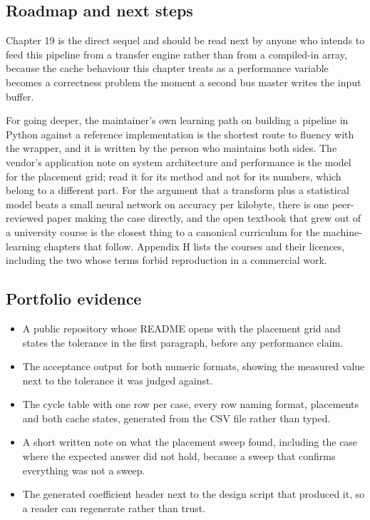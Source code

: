 \subsection*{Roadmap and next steps}

Chapter 19 is the direct sequel and should be read next by anyone who intends
to feed this pipeline from a transfer engine rather than from a compiled-in
array, because the cache behaviour this chapter treats as a performance
variable becomes a correctness problem the moment a second bus master writes
the input buffer.

For going deeper, the maintainer's own learning path on building a pipeline in
Python against a reference implementation is the shortest route to fluency with
the wrapper, and it is written by the person who maintains both sides. The
vendor's application note on system architecture and performance is the model
for the placement grid; read it for its method and not for its numbers, which
belong to a different part. For the argument that a transform plus a
statistical model beats a small neural network on accuracy per kilobyte, there
is one peer-reviewed paper making the case directly, and the open textbook that
grew out of a university course is the closest thing to a canonical curriculum
for the machine-learning chapters that follow. Appendix H lists the courses and
their licences, including the two whose terms forbid reproduction in a
commercial work.

\subsection*{Portfolio evidence}

\begin{itemize}
\item A public repository whose README opens with the placement grid and states
the tolerance in the first paragraph, before any performance claim.
\item The acceptance output for both numeric formats, showing the measured
value next to the tolerance it was judged against.
\item The cycle table with one row per case, every row naming format,
placements and both cache states, generated from the CSV file rather than typed.
\item A short written note on what the placement sweep found, including the
case where the expected answer did not hold, because a sweep that confirms
everything was not a sweep.
\item The generated coefficient header next to the design script that produced
it, so a reader can regenerate rather than trust.
\end{itemize}

